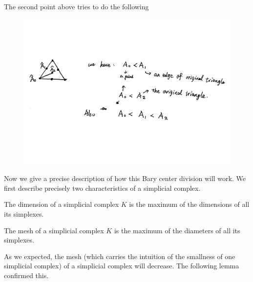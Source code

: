 \begin{remark}
    The second point above tries to do the following
    \begin{figure}[H]
        \centering
        \includegraphics[width=0.9\linewidth]{pics/ch6-scanned-notes-1/p9.pdf}
    \end{figure}
\end{remark}

Now we give a precise description of how this Bary center division
will work. We first describe precisely two characteristics of a
simplicial complex. 

\begin{defi}
    The dimension of a simplicial complex $K$ is the maximum of the
    dimensions of all its simplexes.
\end{defi}
\begin{defi}[mesh $\mu(K)$]
    The mesh of a simplicial complex $K$ is the maximum of the
    diameters of all its simplexes.
\end{defi}

As we expected, the mesh (which carries the intuition of the smallness
of one simplicial complex) of a simplicial complex will decrease. The
following lemma confirmed this.

